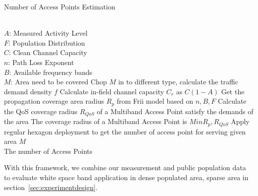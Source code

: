 %
\begin{algorithm}[t]
    \small
\caption{Number of Access Points Estimation}
\label{algorithms:bps}
\begin{algorithmic}[1]
\REQUIRE  ~~\\
	$A$: Measured Activity Level \\
	$F$: Population Distribution\\
	$C$: Clean Channel Capacity\\
	$n$: Path Loss Exponent \\
	$B$: Available frequency bands\\
	$M$: Area need to be covered
\STATE Chop $M$ in to different type, calculate the traffic demand density $f$
\STATE Calculate in-field channel capacity $C_r$ as $C(1-A)$  
\STATE Get the propagation coverage area radius $R_p$ from Frii model based on $n,B,F$
\STATE Calculate the QoS coverage radius $R_{QoS}$ of a Multiband Access Point satisfy the demands of the area
\STATE The coverage radius of a Multiband Access Point is $Min{R_p,R_{QoS}}$
\STATE Apply regular hexagon deployment to get the number of access point for serving given area $M$ 
\ENSURE ~~\\    
 The number of Access Points\\
\end{algorithmic}
\end{algorithm}

With this framework, we combine our measurement and public population data to evaluate white
 space band application in dense populated area, sparse area in section~\ref{sec:experimentdesign}.



